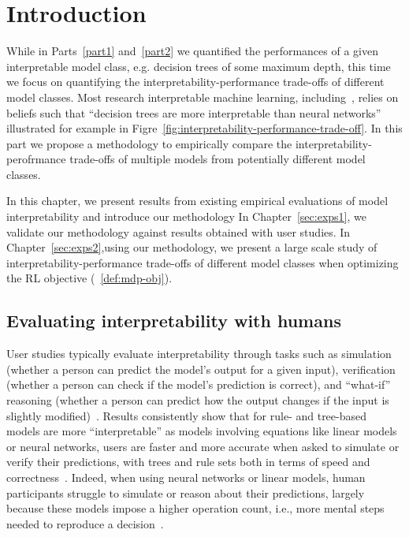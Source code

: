 \chapter{Introduction}
While in Parts~\ref{part1} and~\ref{part2} we quantified the performances of a given interpretable model class, e.g. decision trees of some maximum depth, this time we focus on quantifying the interpretability-performance trade-offs of different model classes.
Most research interpretable machine learning, including~\cite{topin2021iterative}, relies on beliefs such that ``decision trees are more interpretable than neural networks'' illustrated for example in Figre~\ref{fig:interpretability-performance-trade-off}.
In this part we propose a methodology to empirically compare the interpretability-perofrmance trade-offs of multiple models from potentially different model classes.

In this chapter, we present results from existing empirical evaluations of model interpretability and introduce our methodology
In Chapter~\ref{sec:exps1}, we validate our methodology against results obtained with user studies.
In Chapter~\ref{sec:exps2},using our methodology, we present a large scale study of interpretability-performance trade-offs of different model classes when optimizing the RL objective (~\ref{def:mdp-obj}).

\section{Evaluating interpretability with humans}\label{res:humans}
User studies typically evaluate interpretability through tasks such as simulation (whether a person can predict the model’s output for a given input), verification (whether a person can check if the model’s prediction is correct), and “what-if” reasoning (whether a person can predict how the output changes if the input is slightly modified)~\cite{study-6,study-5}.
Results consistently show that for rule- and tree-based models are more ``interpretable'' as models involving equations like linear models or neural networks, users are faster and more accurate when asked to simulate or verify their predictions, with trees and rule sets both in terms of speed and correctness~\citep{study-0,study-1,study-2,study-3,study-7}.
Indeed, when using neural networks or linear models, human participants struggle to simulate or reason about their predictions, largely because these models impose a higher operation count, i.e., more mental steps needed to reproduce a decision~\cite{study-5}.

